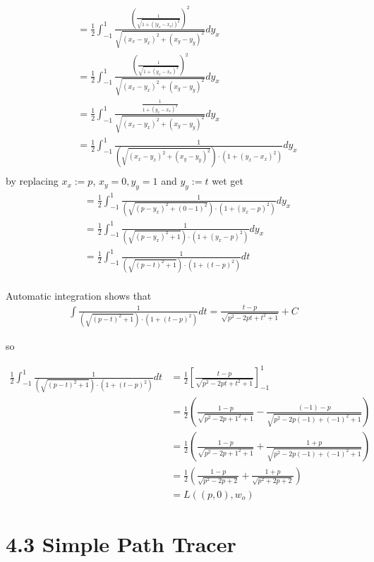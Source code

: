 \documentclass[a4paper]{scrartcl}
\begin{document}
\begin{align*}
  &= \frac{1}{2} \int_{-1}^{1} \frac{\left(\frac{1}{\sqrt{1 + (\lvert y_x - x_x \rvert)^2}}\right)^2}{\sqrt{(x_x - y_x)^2 + (x_y - y_y)^2}} d y_x \\
  &= \frac{1}{2} \int_{-1}^{1} \frac{\left(\frac{1}{\sqrt{1 + ( y_x - x_x )^2}}\right)^2}{\sqrt{(x_x - y_x)^2 + (x_y - y_y)^2}} d y_x \\
  &= \frac{1}{2} \int_{-1}^{1} \frac{\frac{1}{1 + ( y_x - x_x )^2}}{\sqrt{(x_x - y_x)^2 + (x_y - y_y)^2}} d y_x \\
  &= \frac{1}{2} \int_{-1}^{1} \frac{1}{(\sqrt{(x_x - y_x)^2 + (x_y - y_y)^2}) \cdot (1 + ( y_x - x_x )^2)} d y_x \\
\end{align*}
by replacing $x_x := p$, $x_y = 0, y_y=1$ and $y_y:=t$ wet get
\begin{align*}
  &= \frac{1}{2} \int_{-1}^{1} \frac{1}{(\sqrt{(p - y_x)^2 + (0 - 1)^2}) \cdot (1 + ( y_x - p)^2)} d y_x \\
  &= \frac{1}{2} \int_{-1}^{1} \frac{1}{(\sqrt{(p - y_x)^2 + 1}) \cdot (1 + ( y_x - p)^2)} d y_x \\
  &= \frac{1}{2} \int_{-1}^{1} \frac{1}{(\sqrt{(p - t)^2 + 1}) \cdot (1 + ( t- p)^2)} d t \\
\end{align*}


Automatic integration shows that
\begin{align*}
  \int \frac{1}{(\sqrt{(p - t)^2 + 1}) \cdot (1 + ( t- p)^2)} dt = \frac{t-p}{\sqrt{p^2 - 2pt + t^2 + 1}} + C
\end{align*}

so

\begin{align*}
  \frac{1}{2} \int_{-1}^{1} \frac{1}{(\sqrt{(p - t)^2 + 1}) \cdot (1 + ( t- p)^2)} d t 
  &= \frac{1}{2}\left[ \frac{t-p}{\sqrt{p^2 - 2pt + t^2 + 1}} \right]_{-1}^{1} \\
  &= \frac{1}{2} \left( \frac{1-p}{\sqrt{p^2 - 2 p + 1^2 + 1}} -  \frac{(-1)-p}{\sqrt{p^2 - 2p (-1) + (-1)^2 + 1}} \right)\\
  &= \frac{1}{2} \left( \frac{1-p}{\sqrt{p^2 - 2 p + 1^2 + 1}} + \frac{1+p}{\sqrt{p^2 - 2 p (-1) + (-1)^2 + 1}} \right)\\
  &= \frac{1}{2} \left( \frac{1-p}{\sqrt{p^2 - 2p + 2}} + \frac{1+p}{\sqrt{p^2 + 2p + 2}} \right)\\
  &= L((p,0), w_o)
\end{align*}

\section*{4.3 Simple Path Tracer}
\end{document}
